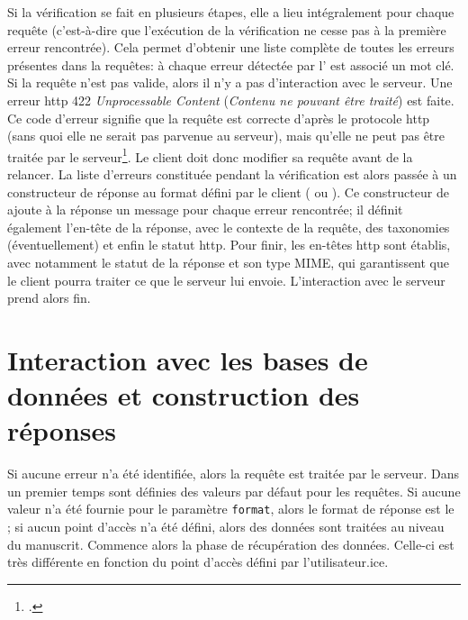 Si la vérification se fait en plusieurs étapes, elle a lieu intégralement pour chaque requête (c'est-à-dire que l'exécution de la vérification ne cesse pas à la première erreur rencontrée). Cela permet d'obtenir une liste complète de toutes les erreurs présentes dans la requêtes: à chaque erreur détectée par l'\api{} est associé un mot clé. Si la requête n'est pas valide, alors il n'y a pas d'interaction avec le serveur. Une erreur \gls{http} 422 \textit{Unprocessable Content} (\textit{Contenu ne pouvant être traité}) est faite. Ce code d'erreur signifie que la requête est correcte d'après le protocole \gls{http} (sans quoi elle ne serait pas parvenue au serveur), mais qu'elle ne peut pas être traitée par le serveur\footcite[§15.5.21. \textit{422 Unprocessable Content}]{fielding_http_2022}. Le client doit donc modifier sa requête avant de la relancer. La liste d'erreurs constituée pendant la vérification est alors passée à un constructeur de réponse au format défini par le client (\json{} ou \tei{}). Ce constructeur de ajoute à la réponse un message pour chaque erreur rencontrée; il définit également l'en-tête de la réponse, avec le contexte de la requête, des taxonomies (éventuellement) et enfin le statut \gls{http}. Pour finir, les en-têtes \gls{http} sont établis, avec notamment le statut de la réponse et son type MIME, qui garantissent que le client pourra traiter ce que le serveur lui envoie. L'interaction avec le serveur prend alors fin.

\section{Interaction avec les bases de données et construction des réponses}
Si aucune erreur n'a été identifiée, alors la requête est traitée par le serveur. Dans un premier temps sont définies des valeurs par défaut pour les requêtes. Si aucune valeur n'a été fournie pour le paramètre \texttt{format}, alors le format de réponse est le \json{}; si aucun point d'accès n'a été défini, alors des données sont traitées au niveau du manuscrit. Commence alors la phase de récupération des données. Celle-ci est très différente en fonction du point d'accès défini par l'utilisateur.ice.

